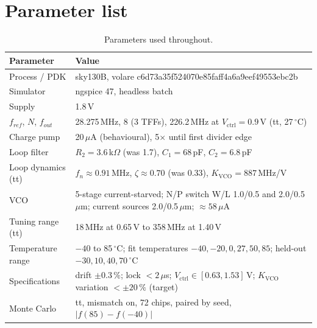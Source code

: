 \documentclass[11pt,a4paper]{article}
\newcommand{\kvco}{K_{\mathrm{VCO}}}
\newcommand{\vc}{V_{\mathrm{ctrl}}}
\newcommand{\degC}{\,$^\circ$C}
\begin{document}
\section{Parameter list}
\begin{table}[!htbp]\centering\small
\begin{tabular}{lp{10.2cm}}\toprule
Parameter & Value\\\midrule
Process / PDK & sky130B, volare c6d73a35f524070e85faff4a6a9eef49553ebc2b\\
Simulator & ngspice 47, headless batch\\
Supply & 1.8\,V\\
$f_{ref}$, $N$, $f_{out}$ & 28.275\,MHz, 8 (3 TFFs), 226.2\,MHz at $\vc=0.9$\,V (tt, 27\degC)\\
Charge pump & 20\,$\mu$A (behavioural), 5$\times$ until first divider edge\\
Loop filter & $R_2=3.6$\,k$\Omega$ (was 1.7), $C_1=68$\,pF, $C_2=6.8$\,pF\\
Loop dynamics (tt) & $f_n\approx0.91$\,MHz, $\zeta\approx0.70$ (was 0.33), $\kvco=887$\,MHz/V\\
VCO & 5-stage current-starved; N/P switch W/L 1.0/0.5 and 2.0/0.5\,$\mu$m; current sources 2.0/0.5\,$\mu$m; $\approx58\,\mu$A\\
Tuning range (tt) & 18\,MHz at 0.65\,V to 358\,MHz at 1.40\,V\\
Temperature range & $-40$ to 85\degC; fit temperatures $-40,-20,0,27,50,85$; held-out $-30,10,40,70$\degC\\
Specifications & drift $\pm0.3\,\%$; lock $<2\,\mu$s; $\vc\in[0.63,1.53]$\,V; $\kvco$ variation $<\pm20\,\%$ (target)\\
Monte Carlo & tt, mismatch on, 72 chips, paired by seed, $|f(85)-f(-40)|$\\\bottomrule
\end{tabular}
\caption{Parameters used throughout.}
\end{table}
\end{document}
